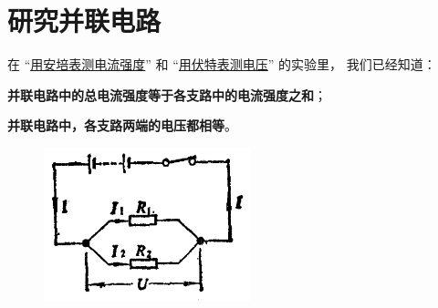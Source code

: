 \section{研究并联电路}\label{sec:8-13}

在 “\hyperref[sec:8-2]{用安培表测电流强度}” 和 “\hyperref[sec:8-4]{用伏特表测电压}” 的实验里，
我们已经知道：

\textbf{并联电路中的总电流强度等于各支路中的电流强度之和}；

\textbf{并联电路中，各支路两端的电压都相等}。

\begin{figure}
    \centering
    \includegraphics[width=6cm]{../pic/czwl2-ch8-33}
    \caption{}\label{fig:8-33}
\end{figure}

